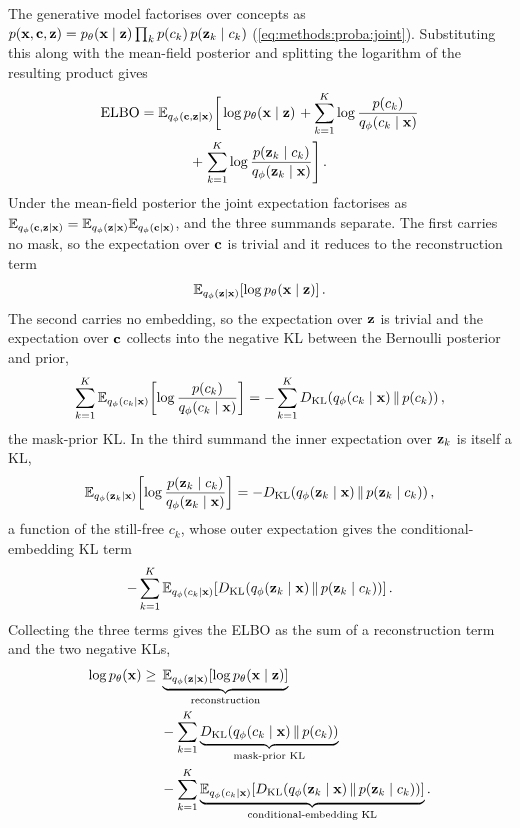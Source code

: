 The generative model factorises over concepts as
$p(\vb{x}, \vb{c}, \vb{z}) = p_\theta({\vb{x} \mid \vb{z}}) \prod_{k} p(c_k)\, p(\vb{z}_k \mid c_k)$
(\cref{eq:methods:proba:joint}). Substituting this along with the mean-field
posterior and splitting the logarithm of the resulting product gives
\begin{multline*}
    \mathrm{ELBO} = \E[q_\phi(\vb{c}, \vb{z} \mid \vb{x})]{
        \vphantom{\frac{1}{1}}
        \log p_\theta(\vb{x} \mid \vb{z})\right.
        + \sum_{k=1}^{K} \log \frac{p(c_k)}{q_\phi(c_k \mid \vb{x})}\\
        + \left.\sum_{k=1}^{K} \log \frac{p(\vb{z}_k \mid c_k)}{q_\phi(\vb{z}_k \mid \vb{x})}}.
\end{multline*}
Under the mean-field posterior the joint expectation factorises as
$\mathbb{E}_{q_\phi(\vb{c}, \vb{z} \mid \vb{x})} = \mathbb{E}_{q_\phi(\vb{z} \mid \vb{x})}\mathbb{E}_{q_\phi(\vb{c} \mid \vb{x})}$,
and the three summands separate. The first carries no mask, so the expectation
over $\vb{c}$ is trivial and it reduces to the reconstruction term
\begin{equation*}
    \E[q_\phi(\vb{z} \mid \vb{x})]{\log p_\theta(\vb{x} \mid \vb{z})}.
\end{equation*}
The second carries no embedding, so the expectation over $\vb{z}$ is trivial and
the expectation over $\vb{c}$ collects into the negative \ac{KL} between the
Bernoulli posterior and prior,
\begin{equation*}
    \sum_{k=1}^{K} \E[q_\phi(c_k \mid \vb{x})]{\log \frac{p(c_k)}{q_\phi(c_k \mid \vb{x})}} =
    - \sum_{k=1}^{K} \KL{q_\phi(c_k \mid \vb{x})}{p(c_k)},
\end{equation*}
the mask-prior \ac{KL}. In the third summand the inner expectation over
$\vb{z}_{k}$ is itself a \ac{KL},
\begin{equation*}
    \E[q_\phi(\vb{z}_k \mid \vb{x})]{\log \frac{p(\vb{z}_k \mid c_k)}{q_\phi(\vb{z}_k \mid \vb{x})}}
    = -\KL{q_\phi(\vb{z}_k \mid \vb{x})}{p(\vb{z}_k \mid c_k)},
\end{equation*}
a function of the still-free $c_k$, whose outer expectation gives the
conditional-embedding \ac{KL} term
\begin{equation*}
    - \sum_{k=1}^{K} \E[q_\phi(c_k \mid \vb{x})]{\KL{q_\phi(\vb{z}_k \mid \vb{x})}{p(\vb{z}_k \mid c_k)}}.
\end{equation*}
Collecting the three terms gives the \ac{ELBO} as the sum of a reconstruction
term and the two negative \acp{KL},
\begin{equation} \label{eq:methods:loss:elbo}
    \begin{split}
        \log p_{\theta}(\vb{x}) \ge
        {}& \underbrace{\E[q_{\phi}(\vb{z} \mid \vb{x})]{\log p_{\theta}(\vb{x} \mid \vb{z})}}_{\text{reconstruction}}\\
        &- \sum_{k=1}^{K} \underbrace{\KL{q_{\phi}(c_{k} \mid \vb{x})}{p(c_{k})}}_{\text{mask-prior KL}}\\
        &- \sum_{k=1}^{K} \underbrace{\E[q_{\phi}(c_{k} \mid \vb{x})]{\KL{q_{\phi}(\vb{z}_{k} \mid \vb{x})}{p(\vb{z}_{k} \mid c_{k})}}}_{\text{conditional-embedding KL}}.
    \end{split}
\end{equation}

